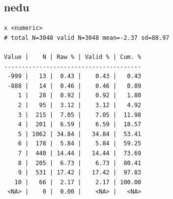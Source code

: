 \documentclass[
  letterpaper,
  DIV=11,
  numbers=noendperiod]{scrreprt}
\newenvironment{Shaded}{\begin{snugshade}}{\end{snugshade}}
\newcommand{\FunctionTok}[1]{\textcolor[rgb]{0.28,0.35,0.67}{#1}}
\newcommand{\NormalTok}[1]{\textcolor[rgb]{0.00,0.23,0.31}{#1}}
\newcommand{\SpecialCharTok}[1]{\textcolor[rgb]{0.37,0.37,0.37}{#1}}
\begin{document}
\hypertarget{nedu}{%
\subsection{nedu}\label{nedu}}

\begin{Shaded}
\end{Shaded}

\begin{verbatim}
x <numeric> 
# total N=3048 valid N=3048 mean=-2.37 sd=88.97

Value |    N | Raw % | Valid % | Cum. %
---------------------------------------
 -999 |   13 |  0.43 |    0.43 |   0.43
 -888 |   14 |  0.46 |    0.46 |   0.89
    1 |   28 |  0.92 |    0.92 |   1.80
    2 |   95 |  3.12 |    3.12 |   4.92
    3 |  215 |  7.05 |    7.05 |  11.98
    4 |  201 |  6.59 |    6.59 |  18.57
    5 | 1062 | 34.84 |   34.84 |  53.41
    6 |  178 |  5.84 |    5.84 |  59.25
    7 |  440 | 14.44 |   14.44 |  73.69
    8 |  205 |  6.73 |    6.73 |  80.41
    9 |  531 | 17.42 |   17.42 |  97.83
   10 |   66 |  2.17 |    2.17 | 100.00
 <NA> |    0 |  0.00 |    <NA> |   <NA>
\end{verbatim}
\end{document}

